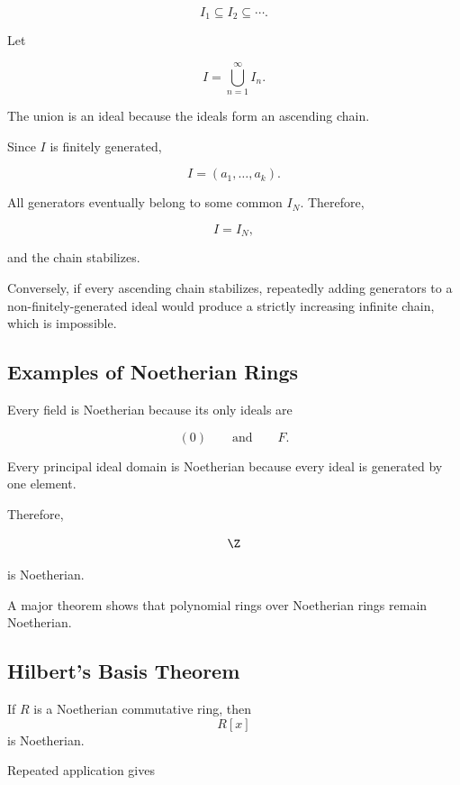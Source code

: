 \[ I_1\subseteq I_2\subseteq\cdots. \]

Let

\[ I=\bigcup_{n=1}^{\infty}I_n. \]

The union is an ideal because the ideals form an ascending chain.

Since \(I\) is finitely generated,

\[ I=(a_1,\ldots,a_k). \]

All generators eventually belong to some common \(I_N\). Therefore,

\[ I=I_N, \]

and the chain stabilizes.

Conversely, if every ascending chain stabilizes, repeatedly adding generators
to a non-finitely-generated ideal would produce a strictly increasing
infinite chain, which is impossible.

\subsection{Examples of Noetherian Rings}
\label{subsec:noetherian-examples}

Every field is Noetherian because its only ideals are

\[ (0)\qquad\text{and}\qquad F. \]

Every principal ideal domain is Noetherian because every ideal is generated
by one element.

Therefore,

\[ \Z \]

is Noetherian.

A major theorem shows that polynomial rings over Noetherian rings remain
Noetherian.

\subsection{Hilbert's Basis Theorem}
\label{subsec:hilbert-basis-theorem}

\begin{theorem}
If \(R\) is a Noetherian commutative ring, then
\[ R[x] \]
is Noetherian.
\end{theorem}

Repeated application gives

